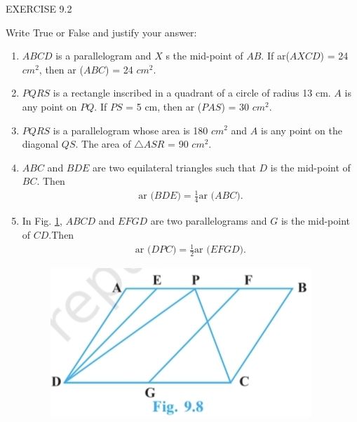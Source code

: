 \documentclass{article}
\begin{document}
\begin{center}
\color{cyan} EXERCISE 9.2
\end{center}
Write True or False and justify your answer:
\begin{enumerate}
	\item $ABCD$ is a parallelogram and $X$ s the mid-point of $AB$. If ar($AXCD$) = 24 \(cm^2\), then ar ($ABC$) = 24 \(cm^2\).
	\item $PQRS$ is a rectangle inscribed in a quadrant of a circle of radius 13 cm. $A$ is any point on $PQ$. If $PS$ = 5 cm, then ar ($PAS$) = 30 \(cm^2\).
	\item $PQRS$ is a parallelogram whose area is 180 \(cm^2\) and $A$ is any point on the diagonal $QS$. The area of $\triangle{ASR}$ = 90 \(cm^2\).
	\item $ABC$ and $BDE$ are two equilateral triangles such that $D$ is the mid-point of $BC$. Then
	\begin{align}
	\text{ar ($BDE$)} = \frac{1}{4} \text{ar ($ABC$)}.
		\label{eq:9.24}
	\end{align}
\item    In Fig. \ref{fig:925}, $ABCD$ and $EFGD$ are     two parallelograms and $G$ is the mid-point of $CD$.Then
		\begin{align}
			\text{ar ($DPC$)} = \frac{1}{2} \text{ar ($EFGD$)}.
			\label{eq:9.25}
		\end{align}
\begin{figure}[h]
	\centering
	\includegraphics[width=\columnwidth]{figs/925.jpg}
	\caption{}
	\label{fig:925}
\end{figure}
\end{enumerate}
\end{document}

